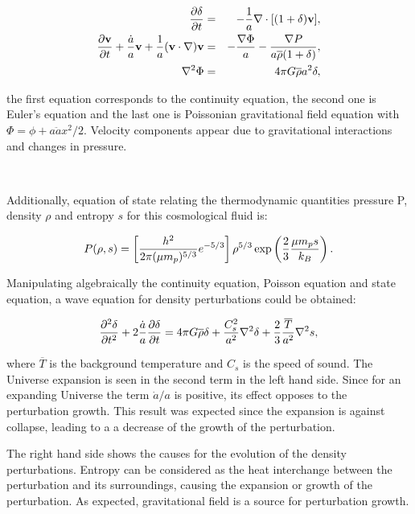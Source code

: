 \begin{eqnarray}
\frac{\partial \delta}{\partial t} &=& -\frac{1}{a}\nabla\cdot[(1+\delta)\textbf{v}], \nonumber\\
\frac{\partial \textbf{v}}{\partial t}+\frac{\dot{a}}{a}\textbf{v}+\frac{1}{a}(\textbf{v}\cdot\nabla)\textbf{v}& = &
-\frac{\nabla \Phi}{a}-\frac{\nabla P}{a\overline{\rho}(1+\delta)},\nonumber\\
\nabla^2 \Phi &=& 4\pi G\overline{\rho}a^2\delta ,
\label{ec.movimiento}
\end{eqnarray}

the first equation corresponds to the continuity equation, the second one is Euler's 
equation and the last one is Poissonian gravitational field equation with $\Phi = \phi +a\ddot{a}x^2/2$. Velocity components appear due to gravitational interactions and changes in pressure.

\

Additionally, equation of state relating the thermodynamic quantities pressure P, 
density $\rho$ and entropy $s$ for this cosmological fluid is: 

\begin{equation}
P(\rho,s)= \left[\frac{h^2}{2\pi(\mu m_p)^{5/3}}e^{-5/3}\right]\rho^{5/3}\exp \left(\frac{2}{3}\frac{\mu m_ps}{k_B}\right) .
\label{ec.estado}
\end{equation}

Manipulating algebraically the continuity equation, Poisson equation and state equation,
a wave equation for density perturbations could be obtained:

\begin{equation}
\frac{\partial^2\delta}{\partial t^2}+2\frac{\dot{a}}{a}\frac{\partial \delta}{\partial t} =
4\pi G \overline{\rho}\delta + \frac{C_s^2}{a^2}\nabla^2\delta+\frac{2}{3}\frac{\overline{T}}{a^2}\nabla^2s ,
\label{onda}
\end{equation}

where $\overline{T}$ is the background temperature and $C_s$ is the speed of sound.
The Universe expansion is seen in the second term in the left hand side. Since for an expanding
Universe the term $\dot{a}/{a}$ is positive, its effect opposes to the 
perturbation growth. This result was expected since the expansion is against collapse, leading to a 
a decrease of the growth of the perturbation. 	

The right hand side shows the causes for the evolution of the density perturbations. 
Entropy can be considered as the heat interchange between the perturbation and 
its surroundings, causing the expansion or growth of the perturbation. As expected, 
gravitational field is a source for perturbation growth. 

